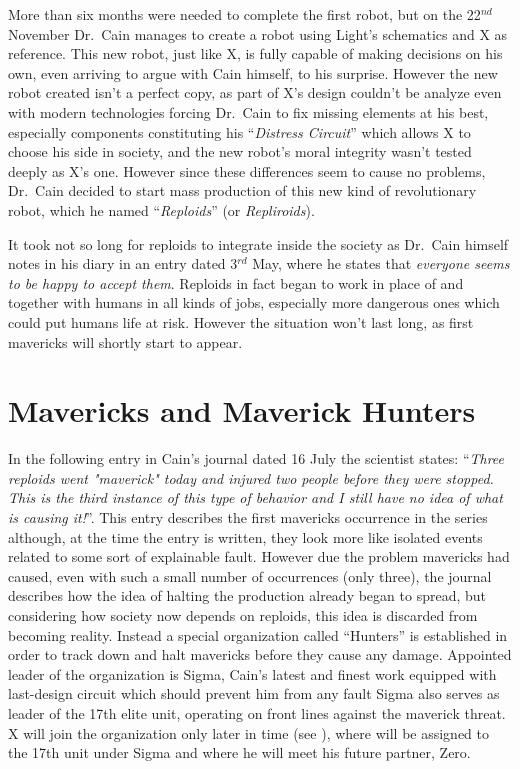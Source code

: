 More than six months were needed to complete the first robot, but on the 22$^{nd}$ November Dr.~Cain manages to create a robot using Light's schematics and X as reference. This new robot, just like X, is fully capable of making decisions on his own, even arriving to argue with Cain himself, to his surprise. However the new robot created isn't a perfect copy, as part of X's design couldn't be analyze even with modern technologies forcing Dr.~Cain to fix missing elements at his best, especially components constituting his ``\emph{Distress Circuit}''\cite{book:RMZ_Complete_works} which allows X to choose his side in society, and the new robot's moral integrity wasn't tested deeply as X's one. However since these differences seem to cause no problems, Dr.~Cain decided to start mass production of this new kind of revolutionary robot, which he named ``\emph{Reploids}''  (or \emph{Repliroids}).

It took not so long for reploids to integrate inside the society as Dr.~Cain himself notes in his diary in an entry dated 3$^{rd}$ May, where he states that \textit{everyone seems to be happy to accept them}. Reploids in fact began to work in place of and together with humans in all kinds of jobs, especially more dangerous ones which could put humans life at risk. However the situation won't last long,  as first mavericks will shortly start to appear.

\section{Mavericks and Maverick Hunters}

In the following entry in Cain's journal dated 16 July the scientist states: ``\textit{Three reploids went "maverick" today and injured two people before they were stopped. This is the third instance of this type of behavior and I still have no idea of what is causing it!}''. This entry describes the first mavericks occurrence in the series although, at the time the entry is written, they look more like isolated events related to some sort of explainable fault. However due the problem mavericks had caused, even with such a small number of occurrences (only three), the journal describes how the idea of halting the production already began to spread, but considering how society now depends on reploids, this idea is discarded from becoming reality. Instead a special organization called ``Hunters'' is  established in order to track down and halt mavericks before they cause any damage. Appointed leader of the organization is Sigma, Cain's latest and finest work equipped with last-design circuit which should prevent him from any fault Sigma also serves as leader of the 17th elite unit, operating on front lines against the maverick threat. X will join the organization only later in time (see \PtIIWarning), where will be assigned to the 17th unit under Sigma and where he will meet his future partner, Zero. 

